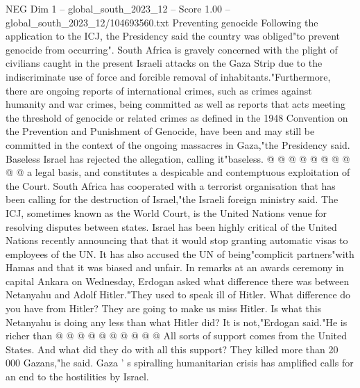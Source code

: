 \begin{textsample}{NEG Dim 1 – global\_south\_2023\_12 – Score 1.00 – global\_south\_2023\_12/104693560.txt}
Preventing genocide Following the application to the ICJ, the Presidency said the country was obliged"to prevent genocide from occurring".
South Africa is gravely concerned with the plight of civilians caught in the present Israeli attacks on the Gaza Strip due to the indiscriminate use of force and forcible removal of inhabitants."Furthermore, there are ongoing reports of international crimes, such as crimes against humanity and war crimes, being committed as well as reports that acts meeting the threshold of genocide or related crimes as defined in the 1948 Convention on the Prevention and Punishment of Genocide, have been and may still be committed in the context of the ongoing massacres in Gaza,"the Presidency said.
Baseless Israel has rejected the allegation, calling it"baseless. @ @ @ @ @ @ @ @ @ @ a legal basis, and constitutes a despicable and contemptuous exploitation of the Court.
South Africa has cooperated with a terrorist organisation that has been calling for the destruction of Israel,"the Israeli foreign ministry said.
The ICJ, sometimes known as the World Court, is the United Nations venue for resolving disputes between states.
Israel has been highly critical of the United Nations recently announcing that that it would stop granting automatic visas to employees of the UN.
It has also accused the UN of being"complicit partners"with Hamas and that it was biased and unfair.
In remarks at an awards ceremony in capital Ankara on Wednesday, Erdogan asked what difference there was between Netanyahu and Adolf Hitler."They used to speak ill of Hitler.
What difference do you have from Hitler?
They are going to make us miss Hitler.
Is what this Netanyahu is doing any less than what Hitler did?
It is not,"Erdogan said."He is richer than @ @ @ @ @ @ @ @ @ @ All sorts of support comes from the United States.
And what did they do with all this support?
They killed more than 20 000 Gazans,"he said.
Gaza ' s spiralling humanitarian crisis has amplified calls for an end to the hostilities by Israel.

\end{textsample}
